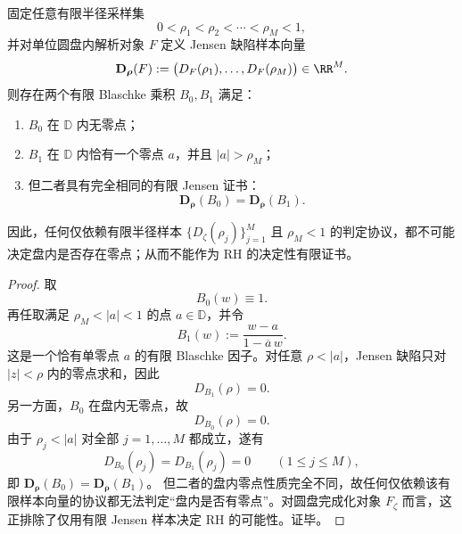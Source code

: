\begin{theorem}\label{thm:xi-time-part60a-finite-jensen-certificate-blindspot}
固定任意有限半径采样集
\[
0<\rho_1<\rho_2<\cdots<\rho_M<1,
\]
并对单位圆盘内解析对象 \(F\) 定义 Jensen 缺陷样本向量
\[
\mathbf D_{\boldsymbol\rho}(F):=
\bigl(D_F(\rho_1),\dots,D_F(\rho_M)\bigr)\in\RR^M.
\]
则存在两个有限 Blaschke 乘积 \(B_0,B_1\) 满足：
\begin{enumerate}
  \item \(B_0\) 在 \(\mathbb D\) 内无零点；
  \item \(B_1\) 在 \(\mathbb D\) 内恰有一个零点 \(a\)，并且 \(|a|>\rho_M\)；
  \item 但二者具有完全相同的有限 Jensen 证书：
  \[
  \boxed{\;
  \mathbf D_{\boldsymbol\rho}(B_0)=\mathbf D_{\boldsymbol\rho}(B_1).\;}
  \]
\end{enumerate}
因此，任何仅依赖有限半径样本
\(\{D_{\zeta}(\rho_j)\}_{j=1}^{M}\) 且 \(\rho_M<1\) 的判定协议，都不可能决定盘内是否存在零点；从而不能作为 RH 的决定性有限证书。
\end{theorem}
\begin{proof}
取
\[
B_0(w)\equiv 1.
\]
再任取满足 \(\rho_M<|a|<1\) 的点 \(a\in\mathbb D\)，并令
\[
B_1(w):=\frac{w-a}{1-\overline a\,w}.
\]
这是一个恰有单零点 \(a\) 的有限 Blaschke 因子。对任意
\(\rho<|a|\)，Jensen 缺陷只对 \(|z|<\rho\) 内的零点求和，因此
\[
D_{B_1}(\rho)=0.
\]
另一方面，\(B_0\) 在盘内无零点，故
\[
D_{B_0}(\rho)=0.
\]
由于 \(\rho_j<|a|\) 对全部 \(j=1,\dots,M\) 都成立，遂有
\[
D_{B_0}(\rho_j)=D_{B_1}(\rho_j)=0
\qquad (1\le j\le M),
\]
即
\(
\mathbf D_{\boldsymbol\rho}(B_0)=\mathbf D_{\boldsymbol\rho}(B_1)
\)。
但二者的盘内零点性质完全不同，故任何仅依赖该有限样本向量的协议都无法判定“盘内是否有零点”。对圆盘完成化对象 \(F_{\zeta}\) 而言，这正排除了仅用有限 Jensen 样本决定 RH 的可能性。证毕。
\end{proof}

